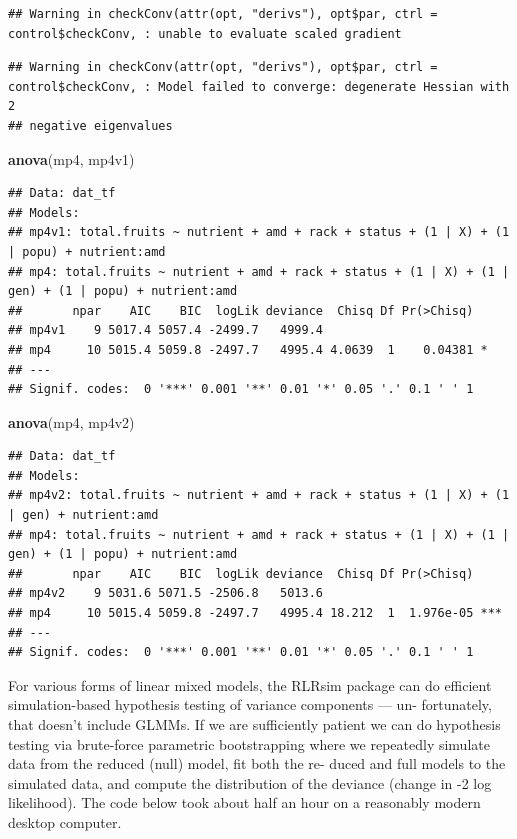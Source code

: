 \documentclass[
  12pt,
]{book}
\newenvironment{Shaded}{\begin{snugshade}}{\end{snugshade}}
\newcommand{\KeywordTok}[1]{\textcolor[rgb]{0.13,0.29,0.53}{\textbf{#1}}}
\newcommand{\NormalTok}[1]{#1}
\begin{document}
\begin{verbatim}
## Warning in checkConv(attr(opt, "derivs"), opt$par, ctrl = control$checkConv, : unable to evaluate scaled gradient
\end{verbatim}

\begin{verbatim}
## Warning in checkConv(attr(opt, "derivs"), opt$par, ctrl = control$checkConv, : Model failed to converge: degenerate Hessian with 2
## negative eigenvalues
\end{verbatim}

\begin{Shaded}
\begin{Highlighting}[]
\KeywordTok{anova}\NormalTok{(mp4, mp4v1)}
\end{Highlighting}
\end{Shaded}

\begin{verbatim}
## Data: dat_tf
## Models:
## mp4v1: total.fruits ~ nutrient + amd + rack + status + (1 | X) + (1 | popu) + nutrient:amd
## mp4: total.fruits ~ nutrient + amd + rack + status + (1 | X) + (1 | gen) + (1 | popu) + nutrient:amd
##       npar    AIC    BIC  logLik deviance  Chisq Df Pr(>Chisq)  
## mp4v1    9 5017.4 5057.4 -2499.7   4999.4                       
## mp4     10 5015.4 5059.8 -2497.7   4995.4 4.0639  1    0.04381 *
## ---
## Signif. codes:  0 '***' 0.001 '**' 0.01 '*' 0.05 '.' 0.1 ' ' 1
\end{verbatim}

\begin{Shaded}
\begin{Highlighting}[]
\KeywordTok{anova}\NormalTok{(mp4, mp4v2)}
\end{Highlighting}
\end{Shaded}

\begin{verbatim}
## Data: dat_tf
## Models:
## mp4v2: total.fruits ~ nutrient + amd + rack + status + (1 | X) + (1 | gen) + nutrient:amd
## mp4: total.fruits ~ nutrient + amd + rack + status + (1 | X) + (1 | gen) + (1 | popu) + nutrient:amd
##       npar    AIC    BIC  logLik deviance  Chisq Df Pr(>Chisq)    
## mp4v2    9 5031.6 5071.5 -2506.8   5013.6                         
## mp4     10 5015.4 5059.8 -2497.7   4995.4 18.212  1  1.976e-05 ***
## ---
## Signif. codes:  0 '***' 0.001 '**' 0.01 '*' 0.05 '.' 0.1 ' ' 1
\end{verbatim}

For various forms of linear mixed models, the RLRsim package can do efficient simulation-based hypothesis testing of variance components --- un- fortunately, that doesn't include GLMMs.
If we are sufficiently patient we can do hypothesis testing via brute-force parametric bootstrapping where we repeatedly simulate data from the reduced (null) model, fit both the re- duced and full models to the simulated data, and compute the distribution of the deviance (change in -2 log likelihood).
The code below took about half an hour on a reasonably modern desktop computer.
\end{document}
